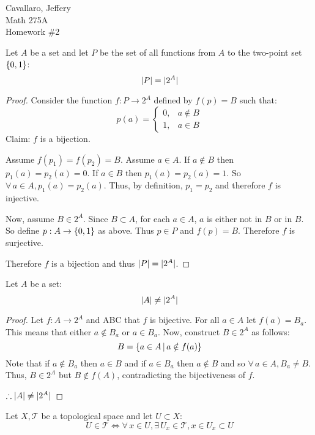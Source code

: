 \documentclass[letterpaper,12pt,fleqn]{article}
\newcommand{\T}{\mathscr{T}}
\begin{document}
Cavallaro, Jeffery \\
Math 275A \\
Homework \#2

\bigskip

\begin{theorem}[1.20]
  Let \(A\) be a set and let \(P\) be the set of all functions from \(A\) to the two-point set \(\{0,1\}\):
  \[\lvert P\rvert=\lvert2^A\rvert\]
\end{theorem}

\begin{proof}
  Consider the function \(f:P\to2^A\) defined by \(f(p)=B\) such that:
  \[p(a)=\begin{cases}
  0, & a\notin B \\
  1, & a\in B
  \end{cases}\]
  Claim: \(f\) is a bijection.

  Assume \(f(p_1)=f(p_2)=B\).  Assume \(a\in A\).  If \(a\notin B\) then \(p_1(a)=p_2(a)=0\).  If \(a\in B\) then
  \(p_1(a)=p_2(a)=1\).  So \(\forall\,a\in A,p_1(a)=p_2(a)\).  Thus, by definition, \(p_1=p_2\) and therefore
  \(f\) is injective.

  Now, assume \(B\in 2^A\).  Since \(B\subset A\), for each \(a\in A\), \(a\) is either not in \(B\) or in \(B\).
  So define \(p:A\to\{0,1\}\) as above.  Thus \(p\in P\) and \(f(p)=B\).  Therefore \(f\) is surjective.

  Therefore \(f\) is a bijection and thus \(\lvert P\rvert=\lvert2^A\rvert\).
\end{proof}

\begin{theorem}[1.22]
  Let \(A\) be a set:
  \[\lvert A\rvert\ne\lvert2^A\rvert\]
\end{theorem}

\begin{proof}
  Let \(f:A\to2^A\) and ABC that \(f\) is bijective.  For all \(a\in A\) let \(f(a)=B_a\).  This means that either
  \(a\notin B_a\) or \(a\in B_a\).  Now, construct \(B\in2^A\) as follows:
  \[B=\left\{{a\in A}\,\middle|\,{a\notin f(a)}\right\}\]
  Note that if \(a\notin B_a\) then \(a\in B\) and if \(a\in B_a\) then \(a\notin B\) and so \(\forall\,a\in
  A,B_a\ne B\).  Thus, \(B\in2^A\) but \(B\notin f(A)\), contradicting the bijectiveness of \(f\).

  \(\therefore\lvert A\rvert\ne\lvert2^A\rvert\)
\end{proof}

\begin{theorem}[2.3]
  Let \(X,\T\) be a topological space and let \(U\subset X\):
  \[U\in\T\iff\forall\,x\in U,\exists\,U_x\in\T,x\in U_x\subset U\]
\end{theorem}
\end{document}
